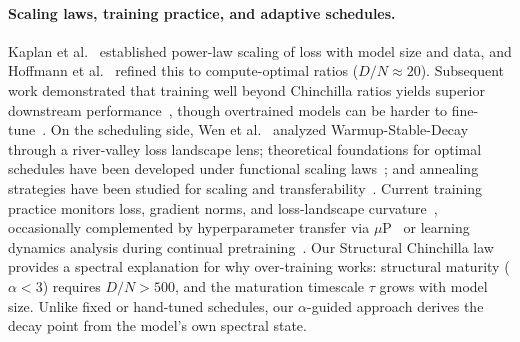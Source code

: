 \paragraph{Scaling laws, training practice, and adaptive schedules.}
Kaplan et al.~\citep{kaplan2020} established power-law scaling of loss with model size and data, and Hoffmann et al.~\citep{hoffmann2022} refined this to compute-optimal ratios ($D/N \approx 20$).
Subsequent work demonstrated that training well beyond Chinchilla ratios yields superior downstream performance~\citep{gadre2024, llama3, muennighoff2023}, though overtrained models can be harder to fine-tune~\citep{overtraining_fragile2025}.
On the scheduling side, Wen et al.~\citep{wsd_schedule} analyzed Warmup-Stable-Decay through a river-valley loss landscape lens; theoretical foundations for optimal schedules have been developed under functional scaling laws~\citep{li_schedules2026, bordelon_schedules2026}; and annealing strategies have been studied for scaling and transferability~\citep{annealing_scaling_law2024, annealing_scaling_aaai2026}.
Current training practice monitors loss, gradient norms, and loss-landscape curvature~\citep{deepseekv3, kalra_curvature2026}, occasionally complemented by hyperparameter transfer via $\mu$P~\citep{mup} or learning dynamics analysis during continual pretraining~\citep{cpt_dynamics2025}.
Our Structural Chinchilla law provides a spectral explanation for why over-training works: structural maturity ($\alpha < 3$) requires $D/N > 500$, and the maturation timescale $\tau$ grows with model size.
Unlike fixed or hand-tuned schedules, our $\alpha$-guided approach derives the decay point from the model's own spectral state.
